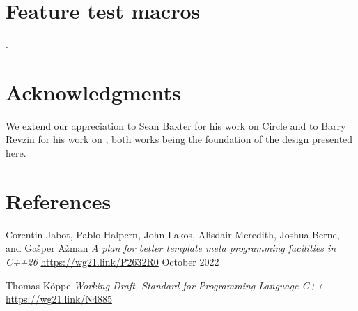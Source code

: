 \documentclass{wg21}
\begin{document}
\section{Feature test macros}

.


\section{Acknowledgments}

We extend our appreciation to Sean Baxter for his work on Circle and to Barry Revzin for his work on , both works being the foundation of the design presented here.

\section{References} %

\renewcommand{\section}[2]{}%



\begin{thebibliography}{9}

Corentin Jabot, Pablo Halpern, John Lakos, Alisdair Meredith, Joshua Berne, and Gašper Ažman\newline
\emph{A plan for better template meta programming facilities in C++26}\newline
\url{https://wg21.link/P2632R0}\newline
October 2022

Thomas Köppe
\emph{Working Draft, Standard for Programming Language C++}\newline
\url{https://wg21.link/N4885}


\end{thebibliography}
\end{document}

